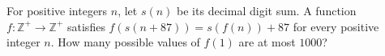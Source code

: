 For positive integers $n$, let $s(n)$ be its decimal digit sum. A function $f:\mathbb Z^+\to\mathbb Z^+$ satisfies $f(s(n+87))=s(f(n))+87$ for every positive integer $n$. How many possible values of $f(1)$ are at most $1000$?
